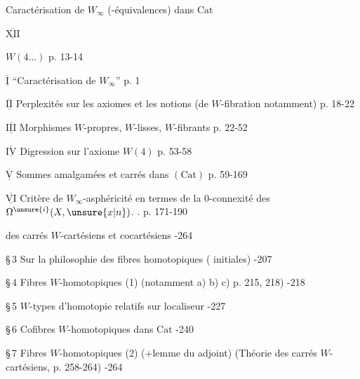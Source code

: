 Caractérisation de $W_\infty$ (-équivalences) dans $\mathrm{Cat}$

$\overline{\underline{\mathrm{XII}}}$

 $W(4\ldots)$ p. 13-14

$\overline{\underline{\mathrm{I}}}$ ``Caractérisation de $W_\infty$'' p. 1

$\overline{\underline{\mathrm{II}}}$ Perplexités sur les axiomes et les notions (de $W$-fibration notamment) p. 18-22

$\overline{\underline{\mathrm{III}}}$ Morphismes $W$-propres, $W$-lisses, $W$-fibrants p. 22-52

$\overline{\underline{\mathrm{IV}}}$ Digression sur l'axiome $W(4)$ p. 53-58

$\overline{\underline{\mathrm{V}}}$ Sommes amalgamées et carrés   dans $(\mathrm{Cat})$  p. 59-169

$\overline{\underline{\mathrm{VI}}}$   Critère de $W_\infty$-asphéricité  en termes de la $0$-connexité des $\Omega^{\unsure{i}}(X,\unsure{x|n})$. . p. 171-190




 des carrés $W$-cartésiens et cocartésiens -264

\S\,3 Sur la philosophie des fibres homotopiques ( initiales) -207

\S\,4 Fibres $W$-homotopiques (1) (notamment a) b) c) p. 215, 218) -218

\S\,5 $W$-types d'homotopie relatifs sur localiseur  -227

\S\,6 Cofibres $W$-homotopiques dans $\mathrm{Cat}$ -240

\S\,7 Fibres $W$-homotopiques (2) ($+$lemme du  adjoint) (Théorie des carrés $W$-cartésiens, p. 258-264) -264

